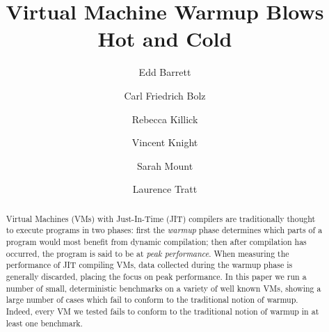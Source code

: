 \documentclass[a4paper,UKenglish]{lipics}
\begin{document}
\title{Virtual Machine Warmup Blows Hot and Cold}
\author[1]{Edd Barrett}
\author[2]{Carl Friedrich Bolz}
\author[3]{Rebecca Killick}
\author[4]{Vincent Knight}
\author[5]{Sarah Mount}
\author[6]{Laurence Tratt}



\maketitle

\begin{abstract}
Virtual Machines (VMs) with Just-In-Time (JIT) compilers are traditionally thought
to execute programs in two phases: first the \emph{warmup} phase determines which
parts of a program would most benefit from dynamic compilation; then after
compilation has occurred, the program is said to be at \emph{peak performance}.
When measuring the performance of JIT compiling VMs, data collected
during the warmup phase is generally discarded, placing the focus on peak
performance. In this paper we run a number of small,
deterministic benchmarks on a variety of well known VMs, showing a large number
of cases which fail to conform to the traditional notion of warmup. Indeed,
every VM we tested fails to conform to the traditional notion of warmup in at
least one benchmark.
\end{abstract}
\end{document}
